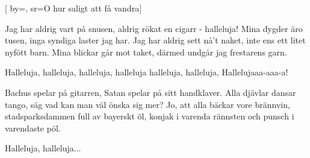 


[ 	%
	by={},	%
	sr={O hur saligt att få vandra}]		%
	
\beginverse*		%
Jag har aldrig vart på snusen,
aldrig rökat en cigarr - halleluja!
Mina dygder äro tusen,
inga syndiga laster jag har.
\endverse
\beginverse*
Jag har aldrig sett nå't naket,
inte ens ett litet nyfött barn.
Mina blickar går mot taket,
därmed undgår jag frestarens garn.
\endverse			%

\beginchorus
Halleluja, halleluja, 
halleluja, halleluja
halleluja, halleluja,
Hallelujaaa-aaa-a!
\endchorus

\beginverse*		%
Bachus spelar på gitarren,
Satan spelar på sitt handklaver.
Alla djävlar dansar tango,
säg vad kan man väl önska sig mer?
\endverse
\beginverse*
Jo, att alla bäckar vore brännvin,
stadsparksdammen full av bayerskt öl,
konjak i varenda rännsten
och punsch i varendaste pöl.
\endverse			%

\beginchorus
Halleluja, halleluja...
\endchorus
\endsong			%
